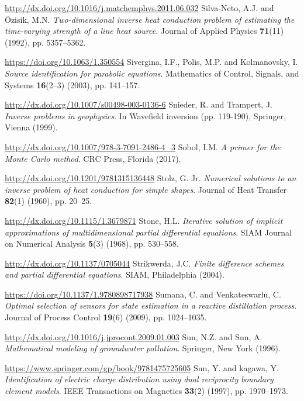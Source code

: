 \begin{thebibliography}{301}
\url{http://dx.doi.org/10.1016/j.matchemphys.2011.06.032}
%
%
 Silva-Neto, A.J. and \"Ozisik, M.N. {\it Two-dimensional inverse heat conduction problem of estimating the time-varying strength of a line heat source}. Journal of Applied Physics {\bf 71}(11) (1992), pp. 5357--5362.

\url{https://doi.org/10.1063/1.350554}
%
%
 Sivergina, I.F., Polis, M.P. and Kolmanovsky, I. {\it Source identification for parabolic equations}. Mathematics of Control, Signals, and Systems {\bf 16}(2--3) (2003), pp. 141--157.

\url{http://dx.doi.org/10.1007/s00498-003-0136-6}
%
%
 Snieder, R. and Trampert, J. {\it Inverse problems in geophysics}. In Wavefield inversion (pp. 119-190), Springer, Vienna (1999).

\url{http://dx.doi.org/10.1007/978-3-7091-2486-4_3}
%
%
 Sobol, I.M. {\it A primer for the Monte Carlo method}. CRC Press, Florida (2017).

\url{http://dx.doi.org/10.1201/9781315136448}
%
%
 Stolz, G. Jr. {\it Numerical solutions to an inverse problem of heat conduction for simple shapes}. Journal of Heat Transfer {\bf 82}(1) (1960), pp. 20--25.

\url{http://dx.doi.org/10.1115/1.3679871}
%
%
 Stone, H.L. {\it Iterative solution of implicit approximations of multidimensional partial differential equations}. SIAM Journal on Numerical Analysis {\bf 5}(3) (1968), pp. 530--558.

\url{http://dx.doi.org/10.1137/0705044}
%
%
 Strikwerda, J.C. {\it Finite difference schemes and partial differential equations}. SIAM, Philadelphia (2004).

\url{https://doi.org/10.1137/1.9780898717938}
%
%
 Sumana, C. and Venkateswarlu, C. {\it Optimal selection of sensors for state estimation in a reactive distillation process}. Journal of Process Control {\bf 19}(6) (2009), pp. 1024--1035.

\url{http://dx.doi.org/10.1016/j.jprocont.2009.01.003}
%
%
 Sun, N.Z. and Sun, A. {\it Mathematical modeling of groundwater pollution}. Springer, New York (1996).

\url{https://www.springer.com/gp/book/9781475725605}
%
%
 Sun, Y. and kagawa, Y. {\it Identification of electric charge distribution using dual reciprocity boundary element models}. IEEE Transactions on Magnetics {\bf 33}(2) (1997), pp. 1970--1973.


\end{thebibliography}
